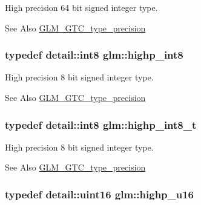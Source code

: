 High precision 64 bit signed integer type. \begin{DoxySeeAlso}{See Also}
\hyperlink{group__gtc__type__precision}{G\-L\-M\-\_\-\-G\-T\-C\-\_\-type\-\_\-precision} 
\end{DoxySeeAlso}
\hypertarget{group__gtc__type__precision_ga57c86999e666760c304453f9bfdc09d1}{
\subsubsection[{highp\-\_\-int8}]{\setlength{\rightskip}{0pt plus 5cm}typedef detail\-::int8 {\bf glm\-::highp\-\_\-int8}}}\label{group__gtc__type__precision_ga57c86999e666760c304453f9bfdc09d1}
High precision 8 bit signed integer type. \begin{DoxySeeAlso}{See Also}
\hyperlink{group__gtc__type__precision}{G\-L\-M\-\_\-\-G\-T\-C\-\_\-type\-\_\-precision} 
\end{DoxySeeAlso}
\hypertarget{group__gtc__type__precision_ga417701b99e6e7992f35ab2ef694f88b2}{
\subsubsection[{highp\-\_\-int8\-\_\-t}]{\setlength{\rightskip}{0pt plus 5cm}typedef detail\-::int8 {\bf glm\-::highp\-\_\-int8\-\_\-t}}}\label{group__gtc__type__precision_ga417701b99e6e7992f35ab2ef694f88b2}
High precision 8 bit signed integer type. \begin{DoxySeeAlso}{See Also}
\hyperlink{group__gtc__type__precision}{G\-L\-M\-\_\-\-G\-T\-C\-\_\-type\-\_\-precision} 
\end{DoxySeeAlso}
\hypertarget{group__gtc__type__precision_ga9da2178d7501d9c0f225fa1a7b70cb45}{
\subsubsection[{highp\-\_\-u16}]{\setlength{\rightskip}{0pt plus 5cm}typedef detail\-::uint16 {\bf glm\-::highp\-\_\-u16}}}\label{group__gtc__type__precision_ga9da2178d7501d9c0f225fa1a7b70cb45}
